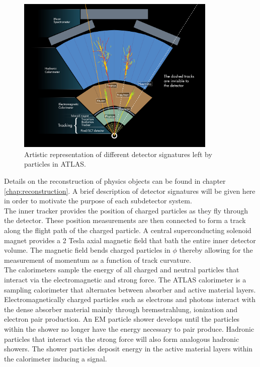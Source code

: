 \begin{figure}[h!]
\centering
\includegraphics[width=0.85\textwidth, angle=0]{figures/LHC_ATLAS/ATLAS_Signature.jpg}
\caption{ Artistic representation of different detector signatures left by particles in ATLAS.  \label{LHC:fig:ATLASSig}}
\end{figure}

\indent Details on the reconstruction of physics objects can be found in chapter \ref{chap:reconstruction}.  A brief description of detector signatures will be given here in order to motivate the purpose of each subdetector system. \\

\indent The inner tracker provides the position of charged particles as they fly through the detector.  These position measurements are then connected to form a track along the flight path of the charged particle.  A central superconducting solenoid magnet provides a 2 Tesla axial magnetic field that bath the entire inner detector volume.  The magnetic field bends charged particles in $\phi$ thereby allowing for the measurement of momentum as a function of track curvature.  \\

\indent The calorimeters sample the energy of all charged and neutral particles that interact via the electromagnetic and strong force.   The ATLAS calorimeter is a sampling calorimeter that alternates between absorber and active material layers.   Electromagnetically charged particles such as electrons and photons interact with the dense absorber material mainly through bremsstrahlung, ionization and electron pair production.  An EM particle shower develops until the particles within the shower no longer have the energy necessary to pair produce.  Hadronic particles that interact via the strong force will also form analogous hadronic showers.  The shower particles deposit energy in the active material layers within the calorimeter inducing a signal.  \\



